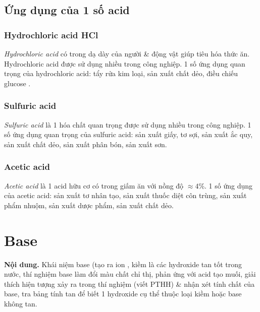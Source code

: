 \documentclass{article}
\begin{document}
\subsection{Ứng dụng của 1 số acid}

\subsubsection{Hydrochloric acid HCl}
\textit{Hydrochloric acid} có trong dạ dày của người \& động vật giúp tiêu hóa thức ăn. Hydrochloric acid được sử dụng nhiều trong công nghiệp. 1 số ứng dụng quan trọng của hydrochloric acid: tẩy rửa kim loại, sản xuất chất dẻo, điều chiếu glucose .

\subsubsection{Sulfuric acid }
\textit{Sulfuric acid} là 1 hóa chất quan trọng được sử dụng nhiều trong công nghiệp. 1 số ứng dụng quan trọng của sulfuric acid: sản xuất giấy, tơ sợi, sản xuất ắc quy, sản xuất chất dẻo, sản xuất phân bón, sản xuất sơn.

\subsubsection{Acetic acid }
\textit{Acetic acid} là 1 acid hữu cơ có trong giấm ăn với nồng độ $\approx4$\%. 1 số ứng dụng của acetic acid: sản xuất tơ nhân tạo, sản xuất thuốc diệt côn trùng, sản xuất phẩm nhuộm, sản xuất dược phẩm, sản xuất chất dẻo.

\noindent{}


\section{Base}
\textsf{\textbf{Nội dung.} Khái niệm base (tạo ra ion , kiềm là các hydroxide tan tốt trong nước, thí nghiệm base làm đổi màu chất chỉ thị, phản ứng với acid tạo muối, giải thích hiện tượng xảy ra trong thí nghiệm (viết PTHH) \& nhận xét tính chất của base, tra bảng tính tan để biết 1 hydroxide cụ thể thuộc loại kiềm hoặc base không tan.}
\end{document}
